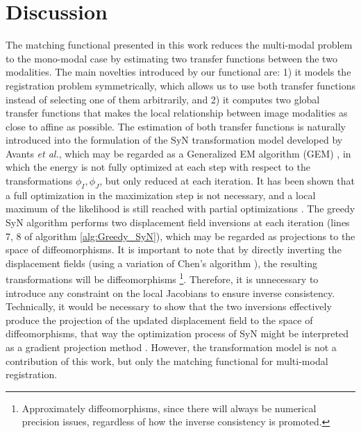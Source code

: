 \section{Discussion}
The matching functional presented in this work reduces the multi-modal problem to the mono-modal case by estimating two transfer functions between the two modalities. The main novelties introduced by our functional are: 1) it models the registration problem symmetrically, which allows us to use both transfer functions instead of selecting one of them arbitrarily, and 2) it computes two global transfer functions that makes the local relationship between image modalities as close to affine as possible. The estimation of both transfer functions is naturally introduced into the formulation of the SyN transformation model developed by Avants {\it et al.}\cite{Avants2008, Avants2011}, which may be regarded as a Generalized EM algorithm (GEM) \citep{Neal1998}, in which the energy is not fully optimized at each step with respect to the transformations $\phi_{I}, \phi_{J}$, but only reduced at each iteration. It has been shown that a full optimization in the maximization step is not necessary, and a local maximum of the likelihood is still reached with partial optimizations \citep{Neal1998}. The greedy SyN algorithm performs two displacement field inversions at each iteration (lines 7, 8 of algorithm \ref{alg:Greedy_SyN}), which may be regarded as projections to the space of diffeomorphisms. It is important to note that by directly inverting the displacement fields (using a variation of Chen's algorithm \cite{Chen2008}), the resulting transformations will be diffeomorphisms \footnote{Approximately diffeomorphisms, since there will always be numerical precision issues, regardless of how the inverse consistency is promoted.}\cite{Avants2008, Avants2011}. Therefore, it is unnecessary to introduce any constraint on the local Jacobians to ensure inverse consistency. Technically, it would be necessary to show that the two inversions effectively produce the projection of the updated displacement field to the space of diffeomorphisms, that way the optimization process of SyN might be interpreted as a gradient projection method \citep{Xiu2007}. However, the transformation model is not a contribution of this work, but only the matching functional for multi-modal registration.\\

